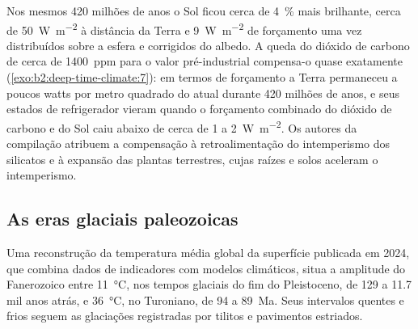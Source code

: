 \begin{omfigure}
\par{}
\end{omfigure}

Nos mesmos 420 milhões de anos o Sol ficou cerca de \qty{4}{\percent} mais brilhante, cerca de
\qty{50}{W.m^{-2}} à distância da Terra e \qty{9}{W.m^{-2}} de forçamento uma vez distribuídos sobre a
esfera e corrigidos do albedo. A queda do dióxido de carbono de cerca de \qty{1400}{ppm} para o
valor pré-industrial compensa-o quase exatamente (\cref{exo:b2:deep-time-climate:7}): em termos de
forçamento a Terra permaneceu a poucos watts por metro quadrado do atual durante 420 milhões de anos,
e seus estados de refrigerador vieram quando o forçamento combinado do dióxido de carbono e do Sol caiu abaixo de cerca de 1
a \qty{2}{W.m^{-2}}. Os autores da compilação atribuem a compensação à retroalimentação do intemperismo
dos silicatos e à expansão das plantas terrestres, cujas raízes e solos aceleram o intemperismo.

\subsection*{As eras glaciais paleozoicas}

Uma reconstrução da temperatura média global da superfície publicada em 2024, que combina dados de indicadores
com modelos climáticos, situa a amplitude do Fanerozoico entre \qty{11}{\celsius}, nos tempos glaciais do
fim do Pleistoceno, de 129 a 11.7 mil anos atrás, e \qty{36}{\celsius}, no Turoniano, de 94 a \qty{89}{Ma}.
Seus intervalos quentes e frios seguem as glaciações registradas por tilitos e pavimentos estriados.

